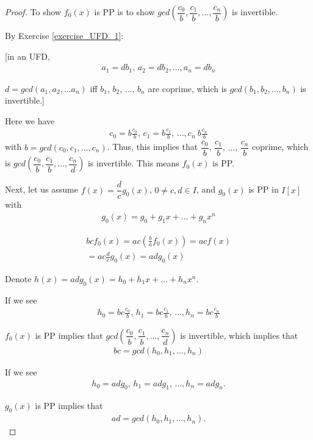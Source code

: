 \documentclass[utf8]{ctexbook}
\theoremstyle{definition}
\begin{document}
\begin{proof}
To show $f_0(x)$ is PP is to show $
gcd(\dfrac{c_0}{b} , \dfrac{c_1}{b} , \ldots , \dfrac{c_n}{b})$ is invertible.

By Exercise \ref{exercise_UFD_1}: 

[in an UFD, 
\begin{align*}
a_1 = d b_1, \, a_2 = d b_2, \ldots, a_n = d b_n
\end{align*}

$d = gcd(a_1, a_2, \ldots a_n)$ iff $b_1$, $b_2$, $\ldots$, $b_n$ are coprime, which is $gcd(b_1, b_2, \ldots, b_n)$ is invertible.]

Here we have
\begin{align*}
c_0 = b \frac{c_0}{b}, \, c_1 = b \frac{c_1}{b}, \, \ldots, c_n \ b \frac{c_n}{b}
\end{align*}
with $b = gcd(c_0, c_1, \ldots, c_n)$. Thus, this implies that $\dfrac{c_0}{b}$, $\dfrac{c_1}{b}$, $\ldots$, $\dfrac{c_n}{b}$ coprime, which is $gcd(\dfrac{c_0}{b}, \dfrac{c_1}{b}, \ldots, \dfrac{c_n}{d})$ is invertible. This means $f_0 (x)$ is PP.

Next, let us assume $f(x) = \dfrac{d}{c} g_0 (x)$, $0 \neq c, d\in I$, and $g_0 (x)$ is PP in $I[x]$ with
\begin{align*}
g_0 (x) = g_0 + g_1 x + \ldots + g_n x^n
\end{align*}

\begin{align*}
bc f_0 (x) = ac (\frac{b}{a} f_0 (x) ) = ac f (x) \\
= ac \frac{d}{c} g_0 (x) = ad g_0 (x)
\end{align*}

Denote $h(x) = a d g_0 (x) = h_0 + h_1 x + \ldots + h_n x^n$.

If we see
\begin{align*}
h_0 = bc \frac{c_0}{b}, \, h_1 = bc \frac{c_1}{b}, \, \ldots, h_n = bc \frac{c_n}{b}
\end{align*}

$f_0(x)$ is PP implies that $gcd(\dfrac{c_0}{b}, \dfrac{c_1}{b}, \ldots, \dfrac{c_n}{d})$ is invertible, which implies that
\begin{align*}
bc = gcd(h_0, h_1, \ldots, h_n)
\end{align*}

If we see
\begin{align*}
h_0 = ad g_0, \, h_1 = ad g_1, \, \ldots, h_n = ad g_n .
\end{align*}

$g_0 (x)$ is PP implies that
\begin{align*}
ad = gcd(h_0, h_1, \ldots, h_n) .
\end{align*} 


\end{proof}
\end{document}
